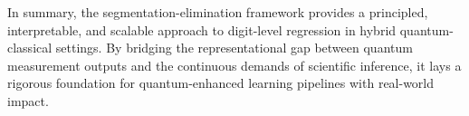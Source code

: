 \documentclass[aps,twocolumn,superscriptaddress,nofootinbib]{revtex4}
\begin{document}
In summary, the segmentation-elimination framework provides a principled, interpretable, and scalable approach to digit-level regression in hybrid quantum-classical settings. By bridging the representational gap between quantum measurement outputs and the continuous demands of scientific inference, it lays a rigorous foundation for quantum-enhanced learning pipelines with real-world impact.


\end{document}
